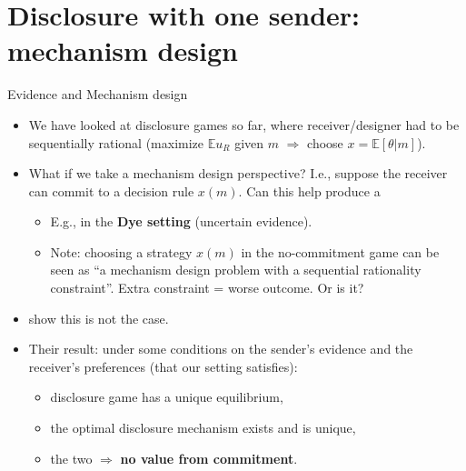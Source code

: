 \documentclass[english,10pt
,aspectratio=169
]{beamer}
\begin{document}
\section{Disclosure with one sender: mechanism design}

\begin{frame}{Evidence and Mechanism design}
\begin{itemize}
	\item We have looked at disclosure games so far, where receiver/designer had to be sequentially rational (maximize $\mathbb{E}u_R$ given $m$ $\Rightarrow$ choose $x=\mathbb{E}[\theta|m]$).
	\item What if we take a mechanism design perspective? I.e., suppose the receiver can \alert{commit} to a decision rule $x(m)$. Can this help produce a 
	\begin{itemize}
		\item E.g., in the \textbf{Dye setting} (uncertain evidence).
		\item Note: choosing a strategy $x(m)$ in the no-commitment game can be seen as ``a mechanism design problem with a sequential rationality constraint''. Extra constraint = worse outcome. Or is it?
	\end{itemize}

	\pause \bigskip 
	\item \citet*{hart_evidence_2017} show this is not the case.
	\item Their result: under some conditions on the sender's evidence and the receiver's preferences (that our setting satisfies): 
	\begin{itemize}
		\item disclosure game has a unique equilibrium,
		\item the optimal disclosure mechanism exists and is unique,
		\item the two  $\Rightarrow$ \textbf{no value from commitment}.
	\end{itemize}
\end{itemize}
\end{frame}
\end{document}
